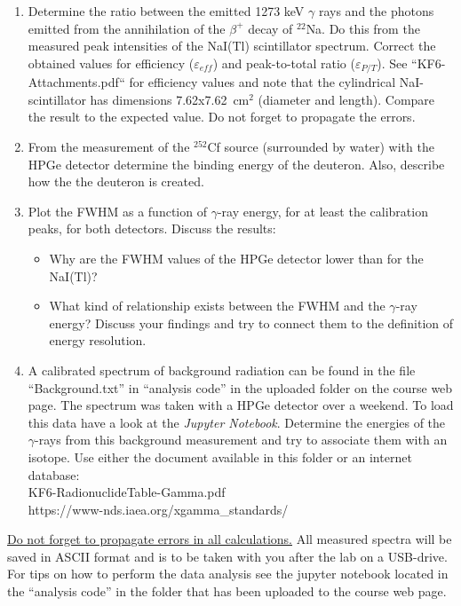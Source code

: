 \documentclass[12pt]{article}
\begin{document}
\begin{enumerate}
  \item Determine the ratio between the emitted 1273 keV $\gamma$ rays and the photons emitted from the annihilation of the $\beta^+$ decay of $^{22}$Na. Do this from the measured peak intensities of the NaI(Tl) scintillator spectrum. Correct the obtained values for efficiency ($\varepsilon_{eff}$) and peak-to-total ratio ($\varepsilon_{P/T}$). See ``KF6-Attachments.pdf`` for efficiency values and note that the cylindrical NaI-scintillator has dimensions 7.62x7.62~cm$^2$ (diameter and length). Compare the result to the expected value. Do not forget to propagate the errors.
  \item From the measurement of the $^{252}$Cf source (surrounded by water) with the HPGe detector determine the binding energy of the deuteron. Also, describe how the the deuteron is created.
  \item Plot the FWHM as a function of $\gamma$-ray energy, for at least the calibration peaks, for both detectors. Discuss the results:
    \begin{itemize}
      \item Why are the FWHM values of the HPGe detector lower than for the NaI(Tl)?
      \item What kind of relationship exists between the FWHM and the $\gamma$-ray energy? Discuss your findings and try to connect them to the definition of energy resolution.
    \end{itemize}
  \item A calibrated spectrum of background radiation can be found in the file ``Background.txt'' in ``analysis code'' in the uploaded folder on the course web page. The spectrum was taken with a HPGe detector over a weekend. To load this data have a look at the {\it Jupyter Notebook}. Determine the energies of the $\gamma$-rays from this background measurement and try to associate them with an isotope. Use either the document available in this folder or an internet database: \\
    KF6-RadionuclideTable-Gamma.pdf \\
    https://www-nds.iaea.org/xgamma\_standards/
\end{enumerate}

\underline{Do not forget to propagate errors in all calculations.} All measured spectra will be saved in ASCII format and is to be taken with you after the lab on a USB-drive. For tips on how to perform the data analysis see the jupyter notebook located in the ``analysis code'' in the folder that has been uploaded to the course web page.
\end{document}
